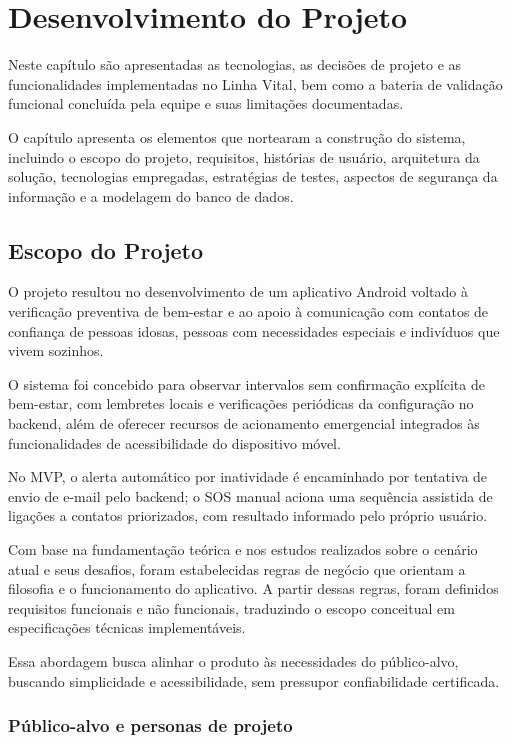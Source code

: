 \chapter{Desenvolvimento do Projeto}

Neste capítulo são apresentadas as tecnologias, as decisões de projeto e as funcionalidades implementadas no Linha Vital, bem como a bateria de validação funcional concluída pela equipe e suas limitações documentadas.

O capítulo apresenta os elementos que nortearam a construção do sistema, incluindo o escopo do projeto, requisitos, histórias de usuário, arquitetura da solução, tecnologias empregadas, estratégias de testes, aspectos de segurança da informação e a modelagem do banco de dados.

\section{Escopo do Projeto}

O projeto resultou no desenvolvimento de um aplicativo Android voltado à verificação preventiva de bem-estar e ao apoio à comunicação com contatos de confiança de pessoas idosas, pessoas com necessidades especiais e indivíduos que vivem sozinhos.

O sistema foi concebido para observar intervalos sem confirmação explícita de bem-estar, com lembretes locais e verificações periódicas da configuração no backend, além de oferecer recursos de acionamento emergencial integrados às funcionalidades de acessibilidade do dispositivo móvel.

No MVP, o alerta automático por inatividade é encaminhado por tentativa de envio de e-mail pelo backend; o SOS manual aciona uma sequência assistida de ligações a contatos priorizados, com resultado informado pelo próprio usuário.

Com base na fundamentação teórica e nos estudos realizados sobre o cenário atual e seus desafios, foram estabelecidas regras de negócio que orientam a filosofia e o funcionamento do aplicativo. A partir dessas regras, foram definidos requisitos funcionais e não funcionais, traduzindo o escopo conceitual em especificações técnicas implementáveis.

Essa abordagem busca alinhar o produto às necessidades do público-alvo, buscando simplicidade e acessibilidade, sem pressupor confiabilidade certificada.


\subsection{Público-alvo e personas de projeto}

